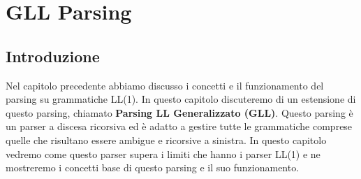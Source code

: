 \chapter{GLL Parsing}\label{cap2}
\section{Introduzione}
Nel capitolo precedente abbiamo discusso i concetti e il funzionamento del parsing su grammatiche LL(1). In questo capitolo discuteremo di un estensione di questo parsing, chiamato \textbf{Parsing LL Generalizzato (GLL)}. Questo parsing è un parser a discesa ricorsiva ed è adatto a gestire tutte le grammatiche comprese quelle che risultano essere ambigue e ricorsive a sinistra. In questo capitolo vedremo come questo parser supera i limiti che hanno i parser LL(1) e ne mostreremo i concetti base di questo parsing e il suo funzionamento.
